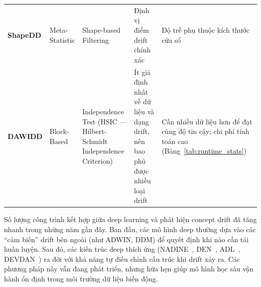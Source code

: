 \begin{table}[H]
\begin{tabular}{@{}lp{2.8cm}p{2.5cm}p{3cm}p{3cm}@{}}
		\addlinespace
		\textbf{ShapeDD}    & Meta-Statistic              & Shape-based Filtering    & Định vị điểm drift chính xác~\cite{shapeDD2021}             & Độ trễ phụ thuộc kích thước cửa sổ~\cite{shapeDD2021}                    \\
		\addlinespace
		\textbf{DAWIDD}     & Block-Based                 & Independence Test (HSIC --- Hilbert-Schmidt Independence Criterion) & Ít giả định nhất về dữ liệu và dạng drift, nên bao phủ được nhiều loại drift~\cite{hinder2020dawidd, hinder2024survey_partA} & Cần nhiều dữ liệu hơn để đạt cùng độ tin cậy; chi phí tính toán cao (Bảng~\ref{tab:runtime_stats})~\cite{hinder2024survey_partA} \\
		\bottomrule
	\end{tabular}
\end{table}

Số lượng công trình kết hợp giữa deep learning và phát hiện concept drift đã tăng nhanh trong những năm gần đây. Ban đầu, các mô hình deep thường dựa vào các ``cảm biến'' drift bên ngoài (như ADWIN, DDM) để quyết định khi nào cần tái huấn luyện. Sau đó, các kiến trúc deep thích ứng (NADINE~\cite{pratama2019automatic}, DEN~\cite{yoon2018den}, ADL~\cite{ashfahani2019adl}, DEVDAN~\cite{ashfahani2020devdan}) ra đời với khả năng tự điều chỉnh cấu trúc khi drift xảy ra. Các phương pháp này vẫn đang phát triển, nhưng hứa hẹn giúp mô hình học sâu vận hành ổn định trong môi trường dữ liệu biến động.

